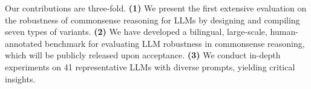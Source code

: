 
Our contributions are three-fold. 
\textbf{(1)} We present the first extensive evaluation on the robustness of commonsense reasoning for LLMs by designing and compiling seven types of variants. 
\textbf{(2)} We have developed a bilingual, large-scale, human-annotated benchmark for evaluating LLM robustness in commonsense reasoning, which will be publicly released upon acceptance. 
\textbf{(3)} We conduct in-depth experiments on 41 representative LLMs with diverse prompts, yielding critical insights. 




